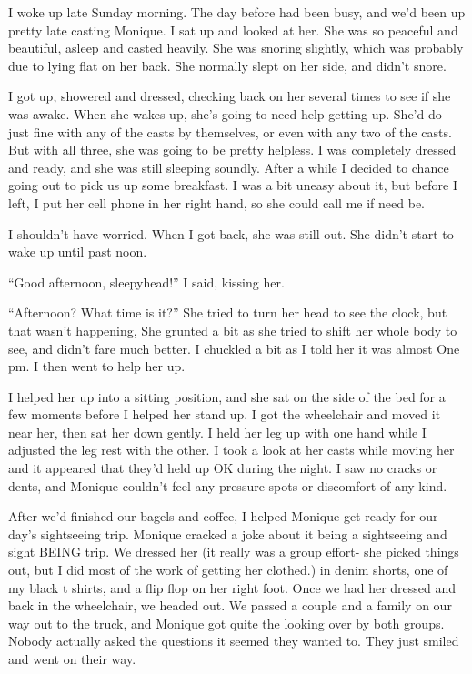 I woke up late Sunday morning. The day before had been busy, and we'd been up pretty late
casting Monique. I sat up and looked at her. She was so peaceful and beautiful, asleep and
casted heavily. She was snoring slightly, which was probably due to lying flat on her back. She
normally slept on her side, and didn't snore.

I got up, showered and dressed, checking back on her several times to see if she was awake.
When she wakes up, she's going to need help getting up. She'd do just fine with any of the casts
by themselves, or even with any two of the casts. But with all three, she was going to be pretty
helpless. I was completely dressed and ready, and she was still sleeping soundly. After a while
I decided to chance going out to pick us up some breakfast. I was a bit uneasy about it, but
before I left, I put her cell phone in her right hand, so she could call me if need be.

I shouldn't have worried. When I got back, she was still out. She didn't start to wake up
until past noon.

``Good afternoon, sleepyhead!'' I said, kissing her.

``Afternoon? What time is it?'' She tried to turn her head to see the clock, but that wasn't
happening, She grunted a bit as she tried to shift her whole body to see, and didn't fare much
better. I chuckled a bit as I told her it was almost One pm. I then went to help her up.

I helped her up into a sitting position, and she sat on the side of the bed for a few
moments before I helped her stand up. I got the wheelchair and moved it near her, then sat her
down gently. I held her leg up with one hand while I adjusted the leg rest with the other. I
took a look at her casts while moving her and it appeared that they'd held up OK during the
night. I saw no cracks or dents, and Monique couldn't feel any pressure spots or discomfort of
any kind.

After we'd finished our bagels and coffee, I helped Monique get ready for our day's
sightseeing trip. Monique cracked a joke about it being a sightseeing and sight BEING trip. We
dressed her (it really was a group effort- she picked things out, but I did most of the work of
getting her clothed.) in denim shorts, one of my black t shirts, and a flip flop on her right
foot. Once we had her dressed and back in the wheelchair, we headed out. We passed a couple and
a family on our way out to the truck, and Monique got quite the looking over by both groups.
Nobody actually asked the questions it seemed they wanted to. They just smiled and went on their
way.

